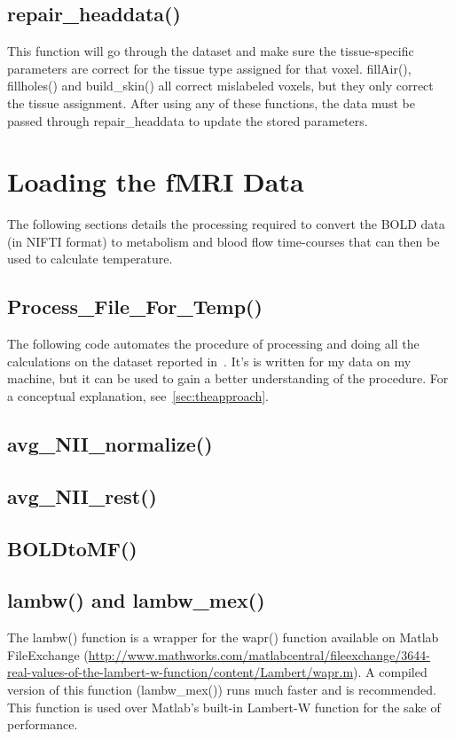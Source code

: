 \subsection{repair\_headdata()}
This function will go through the dataset and make sure the tissue-specific parameters are correct for the tissue type assigned for that voxel.  fillAir(), fillholes() and build\_skin() all correct mislabeled voxels, but they only correct the tissue assignment.  After using any of these functions, the data must be passed through repair\_headdata to update the stored parameters.

\clearpage
\section{Loading the fMRI Data}
\label{sec:fmriprocessing}
The following sections details the processing required to convert the BOLD data (in NIFTI format) to metabolism and blood flow time-courses that can then be used to calculate temperature.
\subsection{Process\_File\_For\_Temp()}
The following code automates the procedure of processing and doing all the calculations on the dataset reported in~\citet{dhamala}.  It's is written for my data on my machine, but it can be used to gain a better understanding of the procedure. For a conceptual explanation, see~\cref{sec:theapproach}.

\subsection{avg\_NII\_normalize()}

\subsection{avg\_NII\_rest()}

\subsection{BOLDtoMF()}

\subsection{lambw() and lambw\_mex()}
The lambw() function is a wrapper for the wapr() function available on Matlab FileExchange (\url{http://www.mathworks.com/matlabcentral/fileexchange/3644-real-values-of-the-lambert-w-function/content/Lambert/wapr.m}).  A compiled version of this function (lambw\_mex()) runs much faster and is recommended.  This function is used over Matlab's built-in Lambert-W function for the sake of performance.

\clearpage
